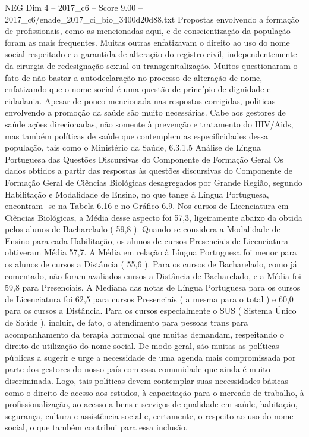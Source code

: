 \begin{textsample}{NEG Dim 4 – 2017\_c6 – Score 9.00 – 2017\_c6/enade\_2017\_ci\_bio\_3400d20d88.txt}
Propostas envolvendo a formação de profissionais, como as mencionadas aqui, e de conscientização da população foram as mais frequentes.
Muitas outras enfatizavam o direito ao uso do nome social respeitado e a garantida de alteração do registro civil, independentemente da cirurgia de redesignação sexual ou transgenitalização.
Muitos questionaram o fato de não bastar a autodeclaração no processo de alteração de nome, enfatizando que o nome social é uma questão de princípio de dignidade e cidadania.
Apesar de pouco mencionada nas respostas corrigidas, políticas envolvendo a promoção da saúde são muito necessárias.
Cabe aos gestores de saúde ações direcionadas, não somente à prevenção e tratamento do HIV/Aids, mas também políticas de saúde que contemplem as especificidades dessa população, tais como o Ministério da Saúde, 6.3.1.5 Análise de Língua Portuguesa das Questões Discursivas do Componente de Formação Geral Os dados obtidos a partir das respostas às questões discursivas do Componente de Formação Geral de Ciências Biológicas desagregados por Grande Região, segundo Habilitação e Modalidade de Ensino, no que tange à Língua Portuguesa, encontram -se na Tabela 6.16 e no Gráfico 6.9.
Nos cursos de Licenciatura em Ciências Biológicas, a Média desse aspecto foi 57,3, ligeiramente abaixo da obtida pelos alunos de Bacharelado ( 59,8 ).
Quando se considera a Modalidade de Ensino para cada Habilitação, os alunos de cursos Presenciais de Licenciatura obtiveram Média 57,7.
A Média em relação à Língua Portuguesa foi menor para os alunos de cursos a Distância ( 55,6 ).
Para os cursos de Bacharelado, como já comentado, não foram avaliados cursos a Distância de Bacharelado, e a Média foi 59,8 para Presenciais.
A Mediana das notas de Língua Portuguesa para os cursos de Licenciatura foi 62,5 para cursos Presenciais ( a mesma para o total ) e 60,0 para os cursos a Distância.
Para os cursos especialmente o SUS ( Sistema Único de Saúde ), incluir, de fato, o atendimento para pessoas trans para acompanhamento da terapia hormonal que muitas demandam, respeitando o direito de utilização do nome social.
De modo geral, são muitas as políticas públicas a sugerir e urge a necessidade de uma agenda mais compromissada por parte dos gestores do nosso país com essa comunidade que ainda é muito discriminada.
Logo, tais políticas devem contemplar suas necessidades básicas como o direito de acesso aos estudos, à capacitação para o mercado de trabalho, à profissionalização, ao acesso a bens e serviços de qualidade em saúde, habitação, segurança, cultura e assistência social e, certamente, o respeito ao uso do nome social, o que também contribui para essa inclusão.

\end{textsample}
